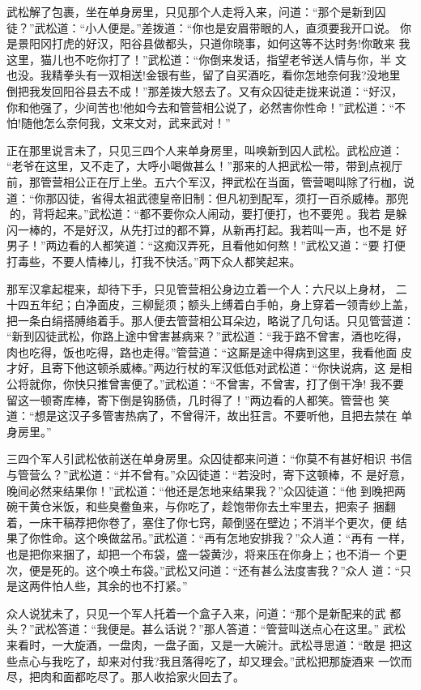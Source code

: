 武松解了包裹，坐在单身房里，只见那个人走将入来，问道：“那个是新到囚
徒？”武松道：“小人便是。”差拨道：“你也是安眉带眼的人，直须要我开口说。
你是景阳冈打虎的好汉，阳谷县做都头，只道你晓事，如何这等不达时务!你敢来
我这里，猫儿也不吃你打了！”武松道：“你倒来发话，指望老爷送人情与你，半
文也没。我精拳头有一双相送!金银有些，留了自买酒吃，看你怎地奈何我?没地里
倒把我发回阳谷县去不成！”那差拨大怒去了。又有众囚徒走拢来说道：“好汉，
你和他强了，少间苦也!他如今去和管营相公说了，必然害你性命！”武松道：“不
怕!随他怎么奈何我，文来文对，武来武对！”

正在那里说言未了，只见三四个人来单身房里，叫唤新到囚人武松。武松应道：
“老爷在这里，又不走了，大呼小喝做甚么！”那来的人把武松一带，带到点视厅
前，那管营相公正在厅上坐。五六个军汉，押武松在当面，管营喝叫除了行枷，说
道：“你那囚徒，省得太祖武德皇帝旧制：但凡初到配军，须打一百杀威棒。那兜
的，背将起来。”武松道：“都不要你众人闹动，要打便打，也不要兜。我若
是躲闪一棒的，不是好汉，从先打过的都不算，从新再打起。我若叫一声，也不是
好男子！”两边看的人都笑道：“这痴汉弄死，且看他如何熬！”武松又道：“要
打便打毒些，不要人情棒儿，打我不快活。”两下众人都笑起来。

那军汉拿起棍来，却待下手，只见管营相公身边立着一个人：六尺以上身材，
二十四五年纪；白净面皮，三柳髭须；额头上缚着白手帕，身上穿着一领青纱上盖，
把一条白绢搭膊络着手。那人便去管营相公耳朵边，略说了几句话。只见管营道：
“新到囚徒武松，你路上途中曾害甚病来？”武松道：“我于路不曾害，酒也吃得，
肉也吃得，饭也吃得，路也走得。”管营道：“这厮是途中得病到这里，我看他面
皮才好，且寄下他这顿杀威棒。”两边行杖的军汉低低对武松道：“你快说病，这
是相公将就你，你快只推曾害便了。”武松道：“不曾害，不曾害，打了倒干净!
我不要留这一顿寄库棒，寄下倒是钩肠债，几时得了！”两边看的人都笑。管营也
笑道：“想是这汉子多管害热病了，不曾得汗，故出狂言。不要听他，且把去禁在
单身房里。”

三四个军人引武松依前送在单身房里。众囚徒都来问道：“你莫不有甚好相识
书信与管营么？”武松道：“并不曾有。”众囚徒道：“若没时，寄下这顿棒，不
是好意，晚间必然来结果你！”武松道：“他还是怎地来结果我？”众囚徒道：“他
到晚把两碗干黄仓米饭，和些臭鲞鱼来，与你吃了，趁饱带你去土牢里去，把索子
捆翻着，一床干稿荐把你卷了，塞住了你七窍，颠倒竖在壁边；不消半个更次，便
结果了你性命。这个唤做盆吊。”武松道：“再有怎地安排我？”众人道：“再有
一样，也是把你来捆了，却把一个布袋，盛一袋黄沙，将来压在你身上；也不消一
个更次，便是死的。这个唤土布袋。”武松又问道：“还有甚么法度害我？”众人
道：“只是这两件怕人些，其余的也不打紧。”

众人说犹未了，只见一个军人托着一个盒子入来，问道：“那个是新配来的武
都头？”武松答道：“我便是。甚么话说？”那人答道：“管营叫送点心在这里。”
武松来看时，一大旋酒，一盘肉，一盘子面，又是一大碗汁。武松寻思道：“敢是
把这些点心与我吃了，却来对付我?我且落得吃了，却又理会。”武松把那旋酒来
一饮而尽，把肉和面都吃尽了。那人收拾家火回去了。

